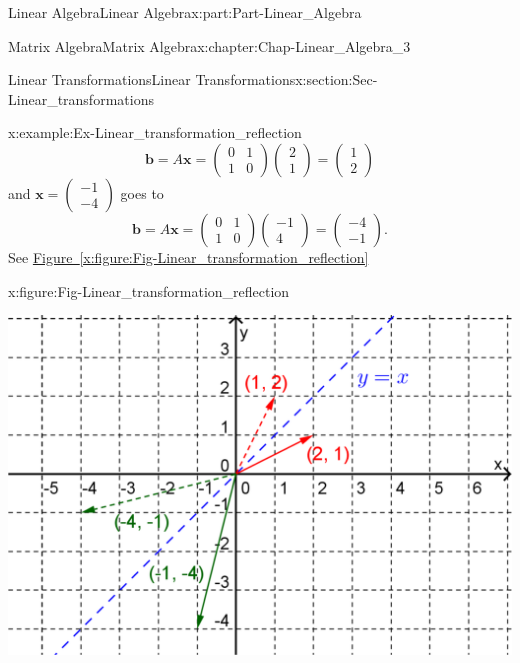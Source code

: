 \documentclass[oneside,10pt,]{book}
\newcommand{\xreffont}{\relax}
\numberwithin{equation}{section}
\newcommand{\amp}{&}
\begin{document}
\begin{partptx}{Linear Algebra}{}{Linear Algebra}{}{}{x:part:Part-Linear_Algebra}
\begin{chapterptx}{Matrix Algebra}{}{Matrix Algebra}{}{}{x:chapter:Chap-Linear_Algebra_3}
\begin{sectionptx}{Linear Transformations}{}{Linear Transformations}{}{}{x:section:Sec-Linear_transformations}
\begin{example}{}{x:example:Ex-Linear_transformation_reflection}
\begin{equation*}
\mathbf{b} = A\mathbf{x} = \begin{pmatrix} 0 \amp 1 \\ 1 \amp 0\end{pmatrix}\begin{pmatrix}2 \\ 1\end{pmatrix} = \begin{pmatrix}1 \\ 2\end{pmatrix}
\end{equation*}
and \(\mathbf{x} = \begin{pmatrix} -1 \\ -4\end{pmatrix}\) goes to%
\begin{equation*}
\mathbf{b} = A\mathbf{x} =\begin{pmatrix} 0 \amp 1 \\ 1 \amp 0\end{pmatrix}\begin{pmatrix} -1\\ 4\end{pmatrix} = \begin{pmatrix} -4 \\ -1\end{pmatrix}.
\end{equation*}
See \hyperref[x:figure:Fig-Linear_transformation_reflection]{Figure~{\xreffont\ref{x:figure:Fig-Linear_transformation_reflection}}} \begin{figureptx}{}{x:figure:Fig-Linear_transformation_reflection}{}%
\begin{image}{0.15}{0.7}{0.15}%
\includegraphics[width=\linewidth]{./LinearAlgebra/Images/3/Linear_transformation.png}

\end{image}
\end{figureptx}
\end{example}
\end{sectionptx}
\end{chapterptx}
\end{partptx}
\end{document}
